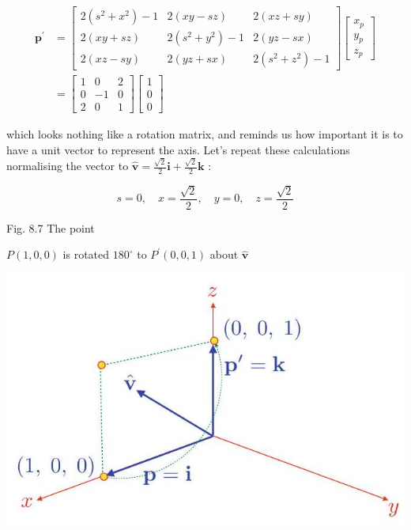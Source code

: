\documentclass[10pt]{article}
\begin{document}
$$
\begin{aligned}
\mathbf{p}^{\prime} & =\left[\begin{array}{ccc}
2\left(s^{2}+x^{2}\right)-1 & 2(x y-s z) & 2(x z+s y) \\
2(x y+s z) & 2\left(s^{2}+y^{2}\right)-1 & 2(y z-s x) \\
2(x z-s y) & 2(y z+s x) & 2\left(s^{2}+z^{2}\right)-1
\end{array}\right]\left[\begin{array}{l}
x_{p} \\
y_{p} \\
z_{p}
\end{array}\right] \\
& =\left[\begin{array}{ccc}
1 & 0 & 2 \\
0 & -1 & 0 \\
2 & 0 & 1
\end{array}\right]\left[\begin{array}{l}
1 \\
0 \\
0
\end{array}\right]
\end{aligned}
$$

which looks nothing like a rotation matrix, and reminds us how important it is to have a unit vector to represent the axis. Let's repeat these calculations normalising the vector to $\hat{\mathbf{v}}=\frac{\sqrt{2}}{2} \mathbf{i}+\frac{\sqrt{2}}{2} \mathbf{k}$ :

$$
s=0, \quad x=\frac{\sqrt{2}}{2}, \quad y=0, \quad z=\frac{\sqrt{2}}{2}
$$

Fig. 8.7 The point

$P(1,0,0)$ is rotated $180^{\circ}$ to $P^{\prime}(0,0,1)$ about $\hat{\mathbf{v}}$

\begin{center}
\includegraphics[max width=\textwidth]{2023_04_20_41f1ceac5a31dc7d1b59g-157}
\end{center}
\end{document}
